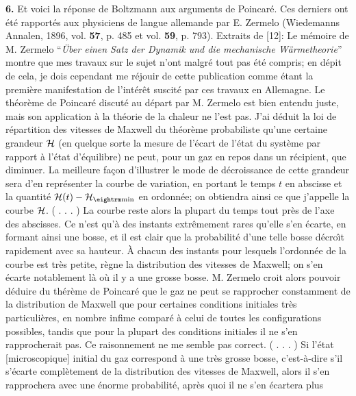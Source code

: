 {\bf 6.}\hskip3mm Et voici la r\'eponse de Boltzmann aux 
arguments de Poincar\'e. 
Ces derniers ont \'et\'e rapport\'es aux physiciens de langue allemande 
par E. Zermelo (Wiedemanns Annalen, {  1896}, vol. {\bf 57},
p. 485 et vol. {\bf 59}, p. 793).
\medskip
Extraits de [12]:   
\medskip
{\cit  Le m\'emoire de M. Zermelo ``{\it\"Uber einen Satz der Dynamik und
die mechanische W\"armetheorie}'' montre que mes travaux sur le sujet n'ont 
malgr\'e tout pas \'et\'e compris; en d\'epit de cela, je dois cependant 
me r\'ejouir de cette publication comme \'etant la premi\`ere manifestation 
de l'int\'er\^et suscit\'e par ces travaux en Allemagne.
\smallskip
Le th\'eor\`eme de Poincar\'e discut\'e au d\'epart par M. Zermelo est bien 
entendu juste, mais son application \`a la th\'eorie de la chaleur ne 
l'est pas. J'ai d\'eduit la loi de r\'epartition des vitesses de Maxwell 
du th\'eor\`eme probabiliste qu'une certaine grandeur ${\cal H}$ (en 
quelque sorte la mesure de l'\'ecart de l'\'etat du syst\`eme par rapport 
\`a l'\'etat d'\'equilibre) ne peut, pour un gaz en repos dans un 
r\'ecipient, que diminuer. La meilleure fa\c{c}on d'illustrer le mode de 
d\'ecroissance de cette grandeur sera d'en repr\'esenter la courbe de 
variation, en portant le temps $t$ en abscisse et la quantit\'e 
${\cal H}(t) - {\cal H}_{\rm min}$ en ordonn\'ee; on obtiendra ainsi ce 
que j'appelle la courbe ${\cal H}$. \hskip6mm ( . . .  )
\smallskip
La courbe reste alors la plupart du temps tout pr\`es de l'axe des 
abscisses. Ce n'est qu'\`a des instants extr\^emement rares qu'elle s'en 
\'ecarte, en formant ainsi une bosse, et il est clair que la probabilit\'e  
d'une telle bosse d\'ecro{\^\i}t rapidement avec sa hauteur. \`A 
chacun des instants pour lesquels l'ordonn\'ee de la courbe est tr\`es 
petite, r\`egne la distribution des vitesses de Maxwell; on s'en \'ecarte 
notablement l\`a o\`u il y a une grosse bosse. M. Zermelo croit alors 
pouvoir d\'eduire du th\'er\`eme de Poincar\'e que le gaz ne peut se 
rapprocher constamment de la distribution de Maxwell que pour certaines 
conditions initiales tr\`es particuli\`eres, en nombre infime compar\'e 
\`a celui de toutes les configurations possibles, tandis que pour la 
plupart des conditions initiales il ne s'en rapprocherait pas. 
Ce raisonnement ne me semble pas correct.  \hskip3mm ( . . .  )
\smallskip
Si l'\'etat [microscopique] initial du gaz correspond \`a une tr\`es 
grosse bosse, c'est-\`a-dire s'il s'\'ecarte compl\`etement de la 
distribution des vitesses de Maxwell, alors il s'en rapprochera avec 
une \'enorme probabilit\'e, apr\`es quoi il ne s'en \'ecartera plus 
}
